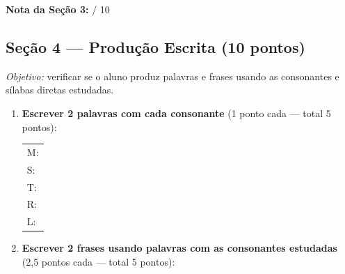 \begin{avaliacao}
\medskip
\noindent\textbf{Nota da Seção 3:} \underline{\hspace{1cm}} / 10

\subsection*{Seção 4 — Produção Escrita (10 pontos)}

\textit{Objetivo:} verificar se o aluno produz palavras e frases
usando as consonantes e sílabas diretas estudadas.

\begin{enumerate}[resume]
  \item \textbf{Escrever 2 palavras com cada consonante} (1 ponto cada — total 5 pontos):

  \begin{center}
  \begin{tabular}{l}
    M: \underline{\hspace{2.5cm}} \quad \underline{\hspace{2.5cm}} \\[0.5em]
    S: \underline{\hspace{2.5cm}} \quad \underline{\hspace{2.5cm}} \\[0.5em]
    T: \underline{\hspace{2.5cm}} \quad \underline{\hspace{2.5cm}} \\[0.5em]
    R: \underline{\hspace{2.5cm}} \quad \underline{\hspace{2.5cm}} \\[0.5em]
    L: \underline{\hspace{2.5cm}} \quad \underline{\hspace{2.5cm}} \\
  \end{tabular}
  \end{center}

  \item \textbf{Escrever 2 frases usando palavras com as consonantes estudadas}
  (2,5 pontos cada — total 5 pontos):

  \begin{center}
  \underline{\hspace{10cm}} \\[0.8em]
  \underline{\hspace{10cm}}
  \end{center}
\end{enumerate}


\end{avaliacao}
